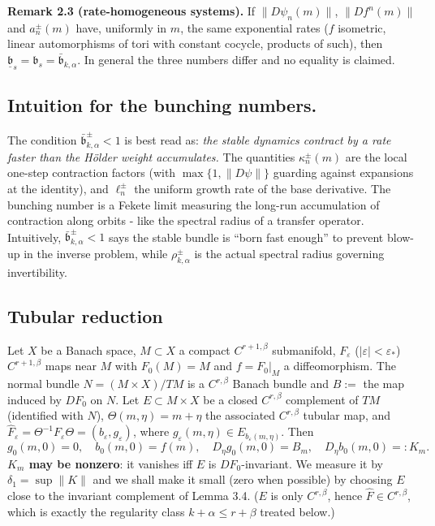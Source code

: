 \documentclass[11pt,a4paper]{article}
\theoremstyle{plain}
\theoremstyle{definition}
\theoremstyle{remark}
\numberwithin{equation}{section}
\numberwithin{figure}{section}
\begin{document}
\textbf{Remark 2.3 (rate-homogeneous systems).} If $\|D\psi_n(m)\|$, $\|Df^n(m)\|$ and $a^\pm_n(m)$ have, uniformly in $m$, the same exponential rates ($f$ isometric, linear automorphisms of tori with constant cocycle, products of such), then $\underline{\mathfrak b}_s=\mathfrak b_s=\bar{\mathfrak b}_{k,\alpha}$. In general the three numbers differ and no equality is claimed.

\subsection{Intuition for the bunching numbers.}

The condition $\bar{\mathfrak b}^\pm_{k,\alpha}<1$ is best read as: \textit{the stable dynamics contract by a rate faster than the Hölder weight accumulates.} The quantities $\kappa^\pm_n(m)$ are the local one-step contraction factors (with $\max\{1,\|D\psi\|\}$ guarding against expansions at the identity), and $\ell^\pm_n$ the uniform growth rate of the base derivative. The bunching number is a Fekete limit measuring the long-run accumulation of contraction along orbits - like the spectral radius of a transfer operator. Intuitively, $\bar{\mathfrak b}^\pm_{k,\alpha}<1$ says the stable bundle is ``born fast enough'' to prevent blow-up in the inverse problem, while $\rho^\pm_{k,\alpha}$ is the actual spectral radius governing invertibility.

\subsection{Tubular reduction}

Let $X$ be a Banach space, $M\subset X$ a compact $C^{r+1,\beta}$ submanifold, $F_\varepsilon$ ($|\varepsilon|<\varepsilon_*$) $C^{r+1,\beta}$ maps near $M$ with $F_0(M)=M$ and $f=F_0|_M$ a diffeomorphism. The normal bundle $N=(M\times X)/TM$ is a $C^{r,\beta}$ Banach bundle and $B:=$ the map induced by $DF_0$ on $N$. Let $E\subset M\times X$ be a closed $C^{r,\beta}$ complement of $TM$ (identified with $N$), $\Theta(m,\eta)=m+\eta$ the associated $C^{r,\beta}$ tubular map, and $\widehat F_\varepsilon=\Theta^{-1}F_\varepsilon\Theta=(b_\varepsilon,g_\varepsilon)$, where $g_\varepsilon(m,\eta)\in E_{b_\varepsilon(m,\eta)}$. Then
\[
g_0(m,0)=0,\quad b_0(m,0)=f(m),\quad D_\eta g_0(m,0)=B_m,\quad D_\eta b_0(m,0)=:K_m.
\]
\textbf{$K_m$ may be nonzero}: it vanishes iff $E$ is $DF_0$-invariant. We measure it by $\delta_1=\sup\|K\|$ and we shall make it small (zero when possible) by choosing $E$ close to the invariant complement of Lemma 3.4. ($E$ is only $C^{r,\beta}$, hence $\widehat F\in C^{r,\beta}$, which is exactly the regularity class $k+\alpha\le r+\beta$ treated below.)
\end{document}

